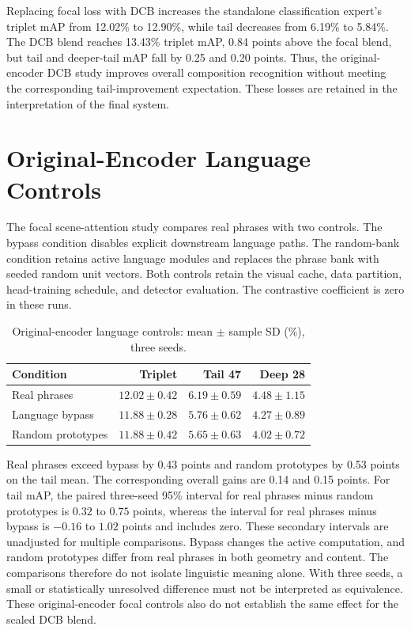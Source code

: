 Replacing focal loss with DCB increases the standalone classification expert's triplet mAP from 12.02\% to 12.90\%, while tail decreases from 6.19\% to 5.84\%. The DCB blend reaches 13.43\% triplet mAP, 0.84 points above the focal blend, but tail and deeper-tail mAP fall by 0.25 and 0.20 points. Thus, the original-encoder DCB study improves overall composition recognition without meeting the corresponding tail-improvement expectation. These losses are retained in the interpretation of the final system.

\section{Original-Encoder Language Controls}

The focal scene-attention study compares real phrases with two controls. The bypass condition disables explicit downstream language paths. The random-bank condition retains active language modules and replaces the phrase bank with seeded random unit vectors. Both controls retain the visual cache, data partition, head-training schedule, and detector evaluation. The contrastive coefficient is zero in these runs.

\begin{table}[htbp]
\centering
\caption{Original-encoder language controls: mean $\pm$ sample SD (\%), three seeds.}
\label{tab:language-controls}
\begin{singlespace}
\begin{tabularx}{\textwidth}{@{}Xrrr@{}}
\toprule
\textbf{Condition} & \textbf{Triplet} & \textbf{Tail 47} & \textbf{Deep 28} \\
\midrule
Real phrases & $12.02\pm0.42$ & $6.19\pm0.59$ & $4.48\pm1.15$ \\
Language bypass & $11.88\pm0.28$ & $5.76\pm0.62$ & $4.27\pm0.89$ \\
Random prototypes & $11.88\pm0.42$ & $5.65\pm0.63$ & $4.02\pm0.72$ \\
\bottomrule
\end{tabularx}
\end{singlespace}
\end{table}

Real phrases exceed bypass by 0.43 points and random prototypes by 0.53 points on the tail mean. The corresponding overall gains are 0.14 and 0.15 points. For tail mAP, the paired three-seed 95\% interval for real phrases minus random prototypes is \(0.32\) to \(0.75\) points, whereas the interval for real phrases minus bypass is \(-0.16\) to \(1.02\) points and includes zero. These secondary intervals are unadjusted for multiple comparisons. Bypass changes the active computation, and random prototypes differ from real phrases in both geometry and content. The comparisons therefore do not isolate linguistic meaning alone. With three seeds, a small or statistically unresolved difference must not be interpreted as equivalence. These original-encoder focal controls also do not establish the same effect for the scaled DCB blend.

